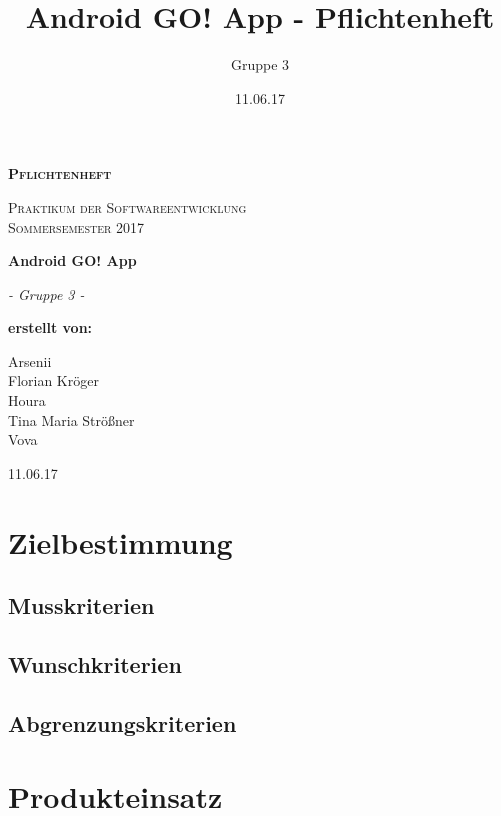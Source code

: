 \documentclass[parskip=full]{scrartcl}
\title{Android GO! App - Pflichtenheft}
\author{Gruppe 3}
\date{11.06.17}
\begin{document}
\begin{titlepage}
	\begin{center}
	{\scshape\LARGE \bfseries Pflichtenheft \par}
	\vspace{1cm}
	{\scshape\Large Praktikum der Softwareentwicklung \\ Sommersemester 2017\par}
	\vspace{1.5cm}
	{\huge\bfseries Android GO! App\par}
	\vspace{2cm}
	{\Large\itshape - Gruppe 3 -\par}
	\vfill
	{\bfseries erstellt von:\par}
	Arsenii \\ %
	Florian Kröger \\
	Houra \\ %
	Tina Maria Strößner \\
	Vova %
	\vfill
	{\large 11.06.17 \par}	
	\end{center}
\end{titlepage}

\tableofcontents


\section{Zielbestimmung}

\subsection{Musskriterien}
\subsection{Wunschkriterien}
\subsection{Abgrenzungskriterien}


\section{Produkteinsatz}
\end{document}
